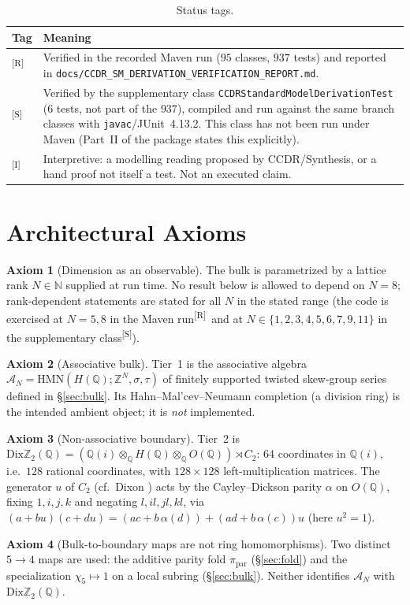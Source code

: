 \documentclass[11pt,a4paper]{article}
\theoremstyle{definition}
\newtheorem{axiom}{Axiom}
\theoremstyle{remark}
\newcommand{\Q}{\mathbb{Q}}
\newcommand{\Z}{\mathbb{Z}}
\newcommand{\HQ}{H(\mathbb{Q})}
\newcommand{\OQ}{O(\mathbb{Q})}
\newcommand{\DZ}{\mathrm{Dix}\mathbb{Z}_2(\mathbb{Q})}
\newcommand{\code}[1]{\texttt{#1}}
\newcommand{\tR}{\textsuperscript{[R]}}
\newcommand{\tS}{\textsuperscript{[S]}}
\newcommand{\tI}{\textsuperscript{[I]}}
\begin{document}
\begin{table}[!htbp]
\centering\small
\begin{tabularx}{\textwidth}{@{}lX@{}}
\toprule
Tag & Meaning \\
\midrule
\tR & Verified in the recorded Maven run ($95$ classes, $937$ tests) and reported in \code{docs/CCDR\_SM\_DERIVATION\_VERIFICATION\_REPORT.md}. \\
\tS & Verified by the supplementary class \code{CCDRStandardModelDerivationTest} (6 tests, not part of the $937$), compiled and run against the same branch classes with \code{javac}/JUnit~4.13.2. This class has not been run under Maven (Part~II of the package states this explicitly). \\
\tI & Interpretive: a modelling reading proposed by CCDR/Synthesis, or a hand proof not itself a test. Not an executed claim. \\
\bottomrule
\end{tabularx}
\caption{Status tags.}\label{tab:legend}
\end{table}

\section{Architectural Axioms}\label{sec:axioms}
\begin{axiom}[Dimension as an observable]\label{ax:N}
The bulk is parametrized by a lattice rank $N\in\mathbb{N}$ supplied at run time. No result below is allowed to depend on $N=8$; rank-dependent statements are stated for all $N$ in the stated range (the code is exercised at $N=5,8$ in the Maven run\tR\ and at $N\in\{1,2,3,4,5,6,7,9,11\}$ in the supplementary class\tS).
\end{axiom}
\begin{axiom}[Associative bulk]\label{ax:bulk}
Tier~1 is the associative algebra $\mathcal{A}_N=\mathrm{HMN}(\HQ;\Z^N,\sigma,\tau)$ of finitely supported twisted skew-group series defined in \S\ref{sec:bulk}. Its Hahn--Mal'cev--Neumann completion (a division ring) is the intended ambient object; it is \emph{not} implemented.
\end{axiom}
\begin{axiom}[Non-associative boundary]\label{ax:boundary}
Tier~2 is $\DZ=(\Q(i)\otimes_\Q \HQ\otimes_\Q \OQ)\rtimes C_2$: $64$ coordinates in $\Q(i)$, i.e.\ $128$ rational coordinates, with $128\times128$ left-multiplication matrices. The generator $u$ of $C_2$ (cf.\ Dixon \cite{Dixon}) acts by the Cayley--Dickson parity $\alpha$ on $\OQ$, fixing $1,i,j,k$ and negating $l,il,jl,kl$, via $(a+bu)(c+du)=(ac+b\,\alpha(d))+(ad+b\,\alpha(c))u$ (here $u^2=1$).
\end{axiom}
\begin{axiom}[Bulk-to-boundary maps are not ring homomorphisms]\label{ax:maps}
Two distinct $5\to4$ maps are used: the additive parity fold $\pi_{\mathrm{par}}$ (\S\ref{sec:fold}) and the specialization $\chi_5\mapsto1$ on a local subring (\S\ref{sec:bulk}). Neither identifies $\mathcal{A}_N$ with $\DZ$.
\end{axiom}
\end{document}
